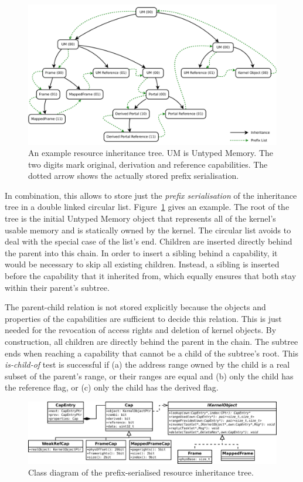 \begin{figure}
  \centering
  \includegraphics[scale=0.25]{fig/cap-tree.pdf}
  \caption{An example resource inheritance tree. UM is Untyped Memory. The two digits mark original, derivation and reference capabilities. The dotted arrow shows the actually stored prefix serialisation.}
  \label{fig:cap-tree}
\end{figure}

In combination, this allows to store just the \emph{prefix serialisation} of the inheritance tree in a double linked circular list. Figure~\ref{fig:cap-tree} gives an example. The root of the tree is the initial Untyped Memory object that represents all of the kernel's usable memory and is statically owned by the kernel. The circular list avoids to deal with the special case of the list's end. Children are inserted directly behind the parent into this chain. In order to insert a sibling behind a capability, it would be necessary to skip all existing children. Instead, a sibling is inserted before the capability that it inherited from, which equally ensures that both stay within their parent's subtree.

The parent-child relation is not stored explicitly because the objects and properties of the capabilities are sufficient to decide this relation. This is just needed for the revocation of access rights and deletion of kernel objects. By construction, all children are directly behind the parent in the chain. The subtree ends when reaching a capability that cannot be a child of the subtree's root. This \emph{is-child-of} test is successful if (a) the address range owned by the child is a real subset of the parent's range, or their ranges are equal and (b) only the child has the reference flag, or (c) only the child has the derived flag.

\begin{figure}
  \centering
  \includegraphics[scale=0.25]{fig/kernel-object-cap.pdf}
  \caption{Class diagram of the prefix-serialised resource inheritance tree.}
  \label{fig:kernel-object-cap}
\end{figure}

